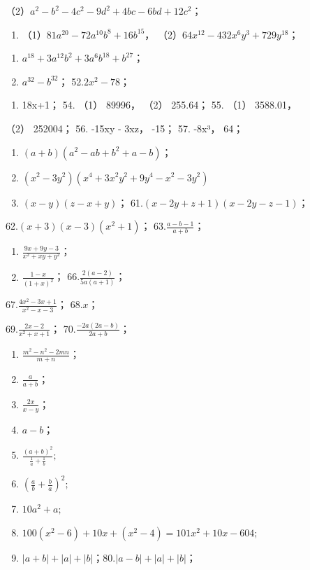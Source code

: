 （2）\(a^2 - b^2 - 4c^2 - 9d^2 + 4bc - 6bd + 12c^2\)；

\begin{enumerate}[start=49]
\item
  （1）\(81a^{20} - 72a^{10}b^{8} + 16b^{15}\)，
  （2）\(64x^{12} - 432x^{6}y^{3} + 729y^{18}\)；
\end{enumerate}

\begin{enumerate}[start=50]
\item
  \(a^{18} + 3a^{12}b^2 + 3a^6b^{18} + b^{27}\)；
\item
  \(a^{32} - b^{32}\)； 52.\(2x^2 - 78\)；
\end{enumerate}

\begin{enumerate}[start=53]
\item
  18x+1； 54. （1） 89996， （2） 255.64； 55. （1） 3588.01，
\end{enumerate}

（2） 252004； 56. -15xy - 3xz， -15； 57. -8x³， 64；

\begin{enumerate}[start=58]
\item
  \((a + b)(a^2 - ab + b^2 + a - b)\)；
\item
  \((x^{2} - 3y^{2})(x^{4} + 3x^{2}y^{2} + 9y^{4} - x^{2} - 3y^{2})\)
\item
  \((x - y)(z - x + y)\)； 61.\((x - 2y + z + 1)(x - 2y - z - 1)\)；
\end{enumerate}

62.\((x + 3)(x - 3)(x^2 + 1)\)； 63.\(\frac{a - b - 1}{a + b}\)；
\begin{enumerate}[start=64]
\item
  \(\frac{9x + 9y - 3}{x^2 + xy + y^2}\)；
\item
  \(\frac{1 - x}{(1 + x)^2}\)； 66.\(\frac{2(a - 2)}{5a(a + 1)}\)；
\end{enumerate}
67.\(\frac{4x^2 - 3x + 1}{x^2 - x - 3}\)； 68.\(x\)；

69.\(\frac{2x - 2}{x^2 + x + 1}\)； 70.\(\frac{-2a(2a - b)}{2a + b}\)；
\begin{enumerate}[start=71]
\item
  \(\frac{m^2 - n^2 - 2mn}{m + n}\)；
\item
  \(\frac{a}{a + b}\)；
\item
  \(\frac{2x}{x - y}\)；
\item
  \(a - b\)；
\item
  \(\frac{(a + b)^2}{\frac{1}{a} + \frac{1}{b}};\)
\item
  \(\left(\frac{a}{b} +\frac{b}{a}\right)^2;\)
\item
  \(10a^{2}+a;\)
\item
  \(100(x^{2} - 6) + 10x + (x^{2} - 4) = 101x^{2} + 10x - 604;\)
\item
  \(|a + b| + |a| + |b|\)；80.\(|a - b| + |a| + |b|\)；
\end{enumerate}

